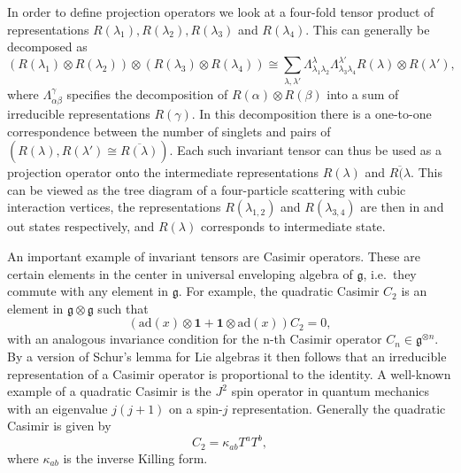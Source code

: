 In order to define projection operators we look at a four-fold tensor product of representations $R(\lambda_1),R(\lambda_2),R(\lambda_3)$ and $R(\lambda_4)$. This can generally be decomposed as 
\begin{equation}
    \left(R(\lambda_1)\otimes R(\lambda_2)\right)\otimes\left(R(\lambda_3)\otimes R(\lambda_4)\right) \cong \sum_{\lambda,\lambda'}\Lambda_{\lambda_1\lambda_2}^\lambda\Lambda_{\lambda_3\lambda_4}^{\lambda'} R(\lambda)\otimes R(\lambda'),
\end{equation}
where $\Lambda_{\alpha\beta}^\gamma$ specifies the decomposition of $R(\alpha)\otimes R(\beta)$ into a sum of irreducible representations $R(\gamma)$. In this decomposition there is a one-to-one correspondence between the number of singlets and pairs of $\left(R(\lambda),R(\lambda')\cong \overbar{R(\lambda)}\right)$. Each such invariant tensor can thus be used as a projection operator onto the intermediate representations $R(\lambda)$ and $\overbar{R(\lambda}$. This can be viewed as the tree diagram of a four-particle scattering with cubic interaction vertices, the representations $R(\lambda_{1,2})$ and $R(\lambda_{3,4})$ are then in and out states respectively, and $R(\lambda)$ corresponds to intermediate state. 

An important example of invariant tensors are Casimir operators. These are certain elements in the center in universal enveloping algebra of $\mathfrak{g}$, i.e.\ they commute with any element in $\mathfrak{g}$. For example, the quadratic Casimir $C_2$ is an element in $\mathfrak{g}\otimes\mathfrak{g}$ such that 
\begin{equation}
    \left(\text{ad}(x)\otimes\mathbf{1}+\mathbf{1}\otimes\text{ad}(x)\right)C_2 = 0,
\end{equation}
with an analogous invariance condition for the n-th Casimir operator $C_n\in\mathfrak{g}^{\otimes n}$. By a version of Schur's lemma for Lie algebras it then follows that an irreducible representation of a Casimir operator is proportional to the identity. A well-known example of a quadratic Casimir is the $J^2$ spin operator in quantum mechanics with an eigenvalue $j(j+1)$ on a spin-$j$ representation. Generally the quadratic Casimir is given by
\begin{equation}
    C_2 = \kappa_{ab}T^aT^b,
\end{equation}
where $\kappa_{ab}$ is the inverse Killing form. 


